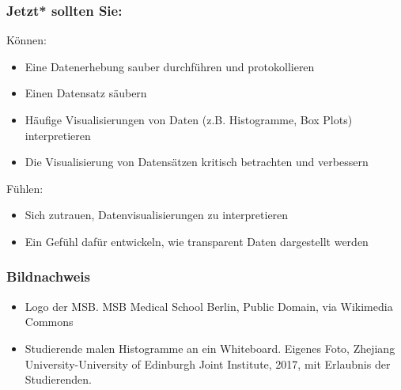 \documentclass{beamer}
\begin{document}
\begin{frame}

\frametitle{Jetzt* sollten Sie:}


\begin{block}{Können:}
\begin{itemize}
\item
Eine Datenerhebung sauber durchführen und protokollieren
\item 
Einen Datensatz säubern
\item
Häufige Visualisierungen von Daten (z.B. Histogramme, Box Plots) interpretieren
\item
Die Visualisierung von Datensätzen kritisch betrachten und verbessern
\end{itemize}
\end{block}

\begin{block}{Fühlen:}

\begin{itemize}
\item
Sich zutrauen, Datenvisualisierungen zu interpretieren
\item 
Ein Gefühl dafür entwickeln, wie transparent Daten dargestellt werden
\end{itemize}

\end{block}


\end{frame}










\begin{frame}
\frametitle{Bildnachweis}

\vfill

\begin{tiny}
\begin{itemize}

  
\item
Logo der MSB. MSB Medical School Berlin, Public Domain, via Wikimedia Commons

\item
Studierende malen Histogramme an ein Whiteboard. Eigenes Foto, Zhejiang University-University of Edinburgh Joint Institute, 2017, mit Erlaubnis der Studierenden.
\end{itemize}

\end{tiny}
\end{frame}
\end{document}
